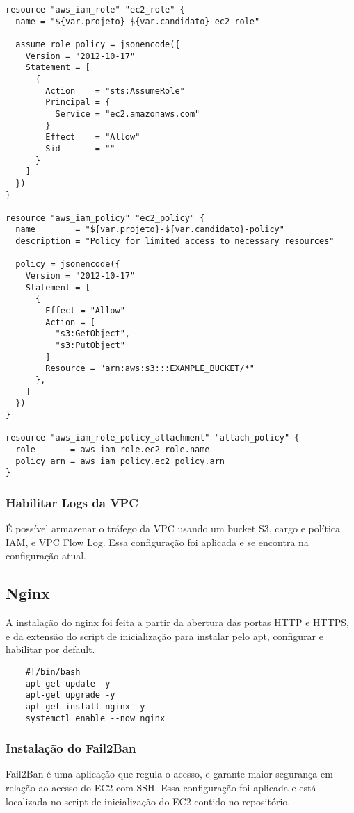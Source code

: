 \documentclass{article}
\begin{document}
\begin{verbatim}
resource "aws_iam_role" "ec2_role" {
  name = "${var.projeto}-${var.candidato}-ec2-role"

  assume_role_policy = jsonencode({
    Version = "2012-10-17"
    Statement = [
      {
        Action    = "sts:AssumeRole"
        Principal = {
          Service = "ec2.amazonaws.com"
        }
        Effect    = "Allow"
        Sid       = ""
      }
    ]
  })
}

resource "aws_iam_policy" "ec2_policy" {
  name        = "${var.projeto}-${var.candidato}-policy"
  description = "Policy for limited access to necessary resources"

  policy = jsonencode({
    Version = "2012-10-17"
    Statement = [
      {
        Effect = "Allow"
        Action = [
          "s3:GetObject",
          "s3:PutObject"
        ]
        Resource = "arn:aws:s3:::EXAMPLE_BUCKET/*"
      },
    ]
  })
}

resource "aws_iam_role_policy_attachment" "attach_policy" {
  role       = aws_iam_role.ec2_role.name
  policy_arn = aws_iam_policy.ec2_policy.arn
}
\end{verbatim}

\subsubsection{Habilitar Logs da VPC}
É possível armazenar o tráfego da VPC usando um bucket S3, cargo e política IAM, e VPC Flow Log. Essa configuração foi aplicada e se encontra na configuração atual.

\subsection{Nginx}
A instalação do nginx foi feita a partir da abertura das portas HTTP e HTTPS, e da extensão do script de inicialização para instalar pelo apt, configurar e habilitar por default.

\begin{verbatim}
    #!/bin/bash
    apt-get update -y
    apt-get upgrade -y
    apt-get install nginx -y
    systemctl enable --now nginx
\end{verbatim}

\subsubsection{Instalação do Fail2Ban}
Fail2Ban é uma aplicação que regula o acesso, e garante maior segurança em relação ao acesso do EC2 com SSH. Essa configuração foi aplicada e está localizada no script de inicialização do EC2 contido no repositório.
\end{document}
